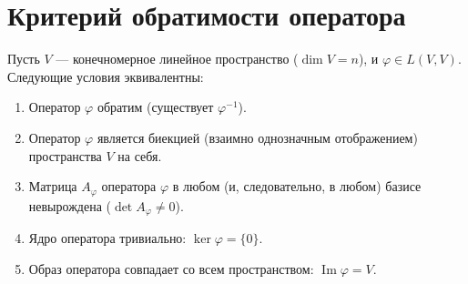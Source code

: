 \section{Критерий обратимости оператора}

\begin{theorem}
Пусть $V$ --- конечномерное линейное пространство ($\dim V = n$), и $\varphi \in L(V, V)$. Следующие условия эквивалентны:
\begin{enumerate}
    \item Оператор $\varphi$ обратим (существует $\varphi^{-1}$).
    \item Оператор $\varphi$ является биекцией (взаимно однозначным отображением) пространства $V$ на себя.
    \item Матрица $A_\varphi$ оператора $\varphi$ в любом (и, следовательно, в любом) базисе невырождена ($\det A_\varphi \neq 0$).
    \item Ядро оператора тривиально: $\ker \varphi = \{0\}$.
    \item Образ оператора совпадает со всем пространством: $\operatorname{Im} \varphi = V$.
\end{enumerate}
\end{theorem}

